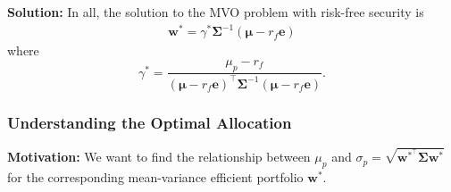 \documentclass[13pt]{article}
\theoremstyle{definition}
\newenvironment{solution}
{\color{C2}\begin{framed}\begingroup\textbf{Solution:} }
  {\endgroup\end{framed}}
\theoremstyle{remark}
\begin{document}
\begin{solution}
{\color{C6}In all, the solution to the MVO problem with risk-free security is 
\begin{align}
    \bm{w}^*=\gamma^*\mathbf{\Sigma}^{-1}(\bm{\mu}- r_f \bm{e})\label{eq:optimal weights risk free}
\end{align}
where 
\[
\gamma^*=\frac{\mu_p-r_{f}}{\left(\bm{\mu}-r_{f} \bm{e}\right)^{\top} \mathbf{\Sigma}^{-1}\left(\bm{\mu}-r_{f} \bm{e}\right)}.
\]}
\end{solution}

\subsubsection{Understanding the Optimal Allocation}
{\color{C6}\textbf{Motivation:} We want to find the relationship between $\mu_p$ and $\sigma_p=\sqrt{\bm{w}^{*^\top} \mathbf{\Sigma}\bm{w}^{*}}$ for the corresponding mean-variance efficient portfolio $\bm{w}^{*}$.}
\end{document}
